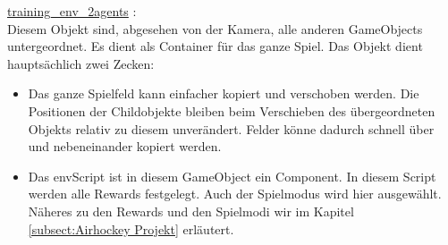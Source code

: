 \underline{training\_env\_2agents} :\\
Diesem Objekt sind, abgesehen von der Kamera, alle anderen GameObjects untergeordnet. Es dient als Container für das ganze Spiel. Das Objekt dient hauptsächlich zwei Zecken:
\begin{itemize}
\item Das ganze Spielfeld kann einfacher kopiert und verschoben werden. Die Positionen der Childobjekte bleiben beim Verschieben des übergeordneten Objekts relativ zu diesem unverändert. Felder könne dadurch schnell über und nebeneinander kopiert werden.
\item Das envScript ist in diesem GameObject ein Component. In diesem Script werden alle Rewards festgelegt. Auch der Spielmodus wird hier ausgewählt. Näheres zu den Rewards und den Spielmodi wir im Kapitel \ref{subsect:Airhockey Projekt} erläutert.
\end{itemize}